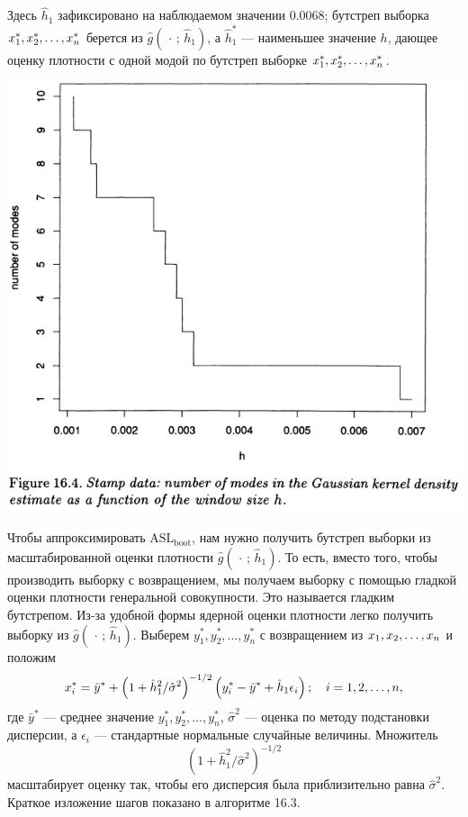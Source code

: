 Здесь $\hat{h}_1$ зафиксировано на наблюдаемом значении $0.0068$; бутстреп выборка $x_1^*,x_2^*,\ldots,x_{n}^*$ берется из $\hat{g}(\,\cdot\,;\, \hat{h}_1)$, а $\hat{h}^{*}_1$ --- наименьшее значение $h$, дающее оценку плотности с одной модой по бутстреп выборке $x_1^*,x_2^*,\ldots,x_{n}^*$.

\newpage
\noindent
\includegraphics[width=\linewidth]{16/f16.4.png}

Чтобы аппроксимировать $\text{ASL}_{\text{boot}}$, нам нужно получить бутстреп выборки из масштабированной оценки плотности $\hat{g}(\,\cdot\,;\, \hat{h}_1)$. То есть, вместо того, чтобы производить выборку с возвращением, мы получаем выборку с помощью гладкой оценки плотности генеральной совокупности. Это называется гладким бутстрепом. Из-за удобной формы ядерной оценки плотности легко получить выборку из $\hat{g}(\,\cdot\,;\, \hat{h}_1)$. Выберем $y^{*}_1, y^{*}_2, \ldots, y^{*}_n$ с возвращением из $x_1,x_2,\ldots,x_{n}$ и положим
\begin{equation}\label{eq16.22}
    x^{*}_i = \bar{y}^{*} + \left(1+\hat{h}^2_1/\hat{\sigma}^2\right)^{-1/2}\left(y^{*}_i - \bar{y}^{*} + \hat{h}_1\epsilon_i\right);\quad i = 1,2,\ldots,n,
\end{equation}
где $\bar{y}^{*}$ --- среднее значение $y^{*}_1, y^{*}_2, \ldots, y^{*}_n$, $\hat{\sigma}^2$ --- оценка по методу подстановки дисперсии, а $\epsilon_i$ --- стандартные нормальные случайные величины. Множитель $$\left(1+\hat{h}^2_1/\hat{\sigma}^2\right)^{-1/2}$$ масштабирует оценку так, чтобы его дисперсия была приблизительно равна $\hat{\sigma}^2$. Краткое изложение шагов показано в алгоритме 16.3.

